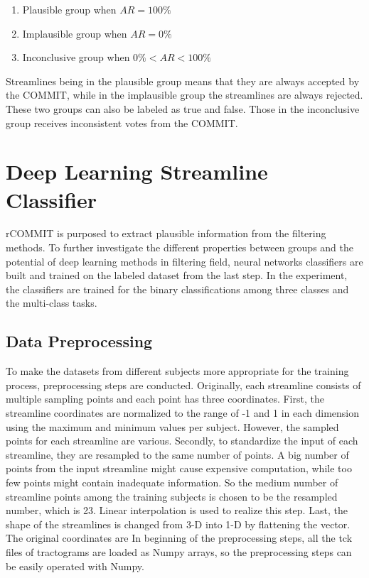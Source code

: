 \begin{enumerate}
    \item Plausible group when $AR = 100\%$
    \item Implausible group when $AR = 0\%$
    \item Inconclusive group when $0\% <AR< 100\%$
  \end{enumerate}

Streamlines being in the plausible group means that they are always accepted by the COMMIT, while in the implausible group the streamlines are always rejected.
These two groups can also be labeled as true and false. Those in the inconclusive group receives inconsistent votes from the COMMIT. 

\section{Deep Learning Streamline Classifier}
rCOMMIT is purposed to extract plausible information from the filtering methods. To further investigate the different properties between groups and the potential
of deep learning methods in filtering field, neural networks classifiers are built and trained on the labeled dataset from the last step.
In the experiment, the classifiers are trained for the binary classifications among three classes and the multi-class tasks.

\subsection{Data Preprocessing}
To make the datasets from different subjects more appropriate for the training process, preprocessing steps are conducted.
Originally, each streamline consists of multiple sampling points and each point has three coordinates. 
First, the streamline coordinates are normalized to the range of -1 and 1 in each dimension using the maximum and minimum values per subject.
However, the sampled points for each streamline are various. Secondly, to standardize the input of each streamline, they are resampled to the same 
number of points. A big number of points from the input streamline might cause expensive computation, while too few points might contain 
inadequate information. So the medium number of streamline points among the training subjects is chosen to be the resampled number, which is 23.
Linear interpolation is used to realize this step. Last, the shape of the streamlines is changed from 3-D into 1-D by flattening the vector. 
The original coordinates are 
In beginning of the preprocessing steps, all the tck files of tractograms are loaded as Numpy arrays, 
so the preprocessing steps can be easily operated with Numpy. 

